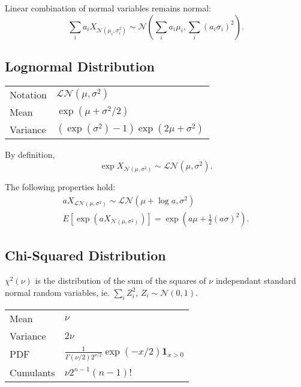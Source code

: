 \documentclass[10pt]{article}
\newcommand{\normal}{\mathscr{N}}
\newcommand{\logNormal}{\mathscr{LN}}
\begin{document}
\begin{outline}
  \1 Linear combination of normal variables remains normal:
  \begin{equation*}
    \sum_i a_i X_{\normal(\mu_i,\sigma^2_i)} \sim \normal(\sum_ia_i\mu_i,\sum_i(a_i \sigma_i)^2).
  \end{equation*}
\end{outline}

\subsection{Lognormal Distribution}
\begin{center}
\begin{tabular}{ll}
  \toprule
  Notation & $\logNormal(\mu,\sigma^2)$\\
  Mean & $\exp(\mu+\sigma^2/2)$\\
  Variance & $(\exp(\sigma^2)-1)\exp(2\mu+\sigma^2)$\\
  \bottomrule
\end{tabular}
\end{center}

\begin{outline}
  \1 By definition,
  \begin{equation*}
    \exp X_{\normal(\mu,\sigma^2)} \sim \logNormal(\mu,\sigma^2).
  \end{equation*}

  \1 The following properties hold:
  \begin{gather*}
    a X_{\logNormal(\mu,\sigma^2)} \sim \logNormal(\mu+\log a,\sigma^2)\\
    E[\exp(aX_{\normal(\mu,\sigma^2)})] = \exp(a\mu + \tfrac{1}{2}(a\sigma)^2).
  \end{gather*}

\end{outline}


\subsection{Chi-Squared Distribution}
\begin{outline}
  \1 $\chi^2(\nu)$ is the distribution of the sum of the squares of $\nu$ independant
  standard normal random variables, ie. $\sum_i Z^2_i$, $Z_i\sim\mathscr{N}(0,1)$.

  \1 
  \begin{tabular}{ll} \toprule
    Mean & $\nu$\\
    Variance & $2\nu$\\
    PDF & $\displaystyle \frac{1}{\Gamma(\nu/2)2^{\nu/2}}\exp(-x/2) \bm
          1_{x>0}$\\
    Cumulants & $\nu 2^{n-1}(n-1)!$\\
    \bottomrule
  \end{tabular}
\end{outline}
\end{document}
